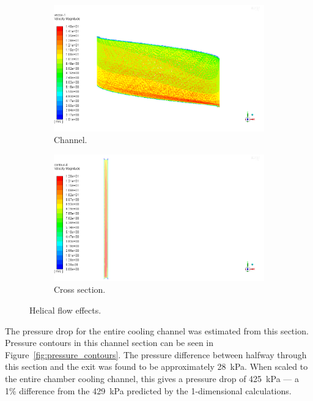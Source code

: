 \documentclass[11pt]{article}
\begin{document}
\begin{figure}[H]
	\centering
	\begin{subfigure}{.7\textwidth}
		\centering
		\includegraphics[width=0.9\linewidth, trim={0 0 5cm 0}, clip]{velocity}
		\caption{Channel.}
	\end{subfigure}%
	\begin{subfigure}{.3\textwidth}
		\centering
  		\includegraphics[width=0.9\linewidth, trim={0 0 20cm 0}, clip]{velocitiy-2}
  		\caption{Cross section.}
	\end{subfigure}
	\caption{Helical flow effects.}
	\label{fig:helical}
\end{figure}

The pressure drop for the entire cooling channel was estimated from this section. Pressure contours in this channel section can be seen in Figure~\ref{fig:pressure_contours}. The pressure difference between halfway through this section and the exit was found to be approximately \SI{28}{\kilo\pascal}. When scaled to the entire chamber cooling channel, this gives a pressure drop of \SI{425}{\kilo\pascal} --- a 1\% difference from the \SI{429}{\kilo\pascal} predicted by the 1-dimensional calculations.
\end{document}
